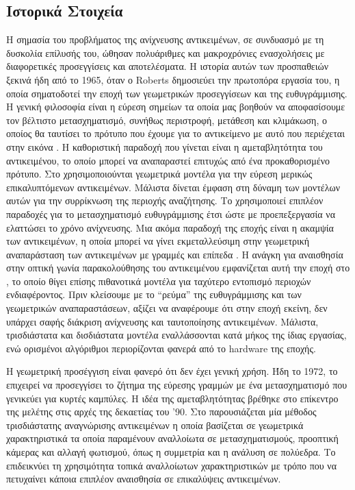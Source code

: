 \documentclass[11pt,a4paper,english,greek,twoside]{../Thesis}
\begin{document}
\subsection{Ιστορικά Στοιχεία}
Η σημασία του προβλήματος της ανίχνευσης αντικειμένων, σε συνδυασμό με τη δυσκολία επίλυσής του, ώθησαν πολυάριθμες και μακροχρόνιες ενασχολήσεις με διαφορετικές προσεγγίσεις και αποτελέσματα. Η ιστορία αυτών των προσπαθειών ξεκινά ήδη από το 1965, όταν ο Roberts \cite{roberts_1963} δημοσιεύει την πρωτοπόρα εργασία του, η οποία σηματοδοτεί την εποχή των γεωμετρικών προσεγγίσεων και της ευθυγράμμισης. Η γενική φιλοσοφία είναι η εύρεση σημείων τα οποία μας βοηθούν να αποφασίσουμε τον βέλτιστο μετασχηματισμό, συνήθως περιστροφή, μετάθεση και κλιμάκωση, ο οποίος θα ταυτίσει το πρότυπο που έχουμε για το αντικείμενο με αυτό που περιέχεται στην εικόνα \cite{huttenlocher_1987}. Η καθοριστική παραδοχή που γίνεται είναι η αμεταβλητότητα του αντικειμένου, το οποίο μπορεί να αναπαραστεί επιτυχώς από ένα προκαθορισμένο πρότυπο. Στο \cite{grimson_1987} χρησιμοποιούνται γεωμετρικά μοντέλα για την εύρεση μερικώς επικαλυπτόμενων αντικειμένων. Μάλιστα δίνεται έμφαση στη δύναμη των μοντέλων αυτών για την συρρίκνωση της περιοχής αναζήτησης. Το \cite{lozanoperez_1986} χρησιμοποιεί επιπλέον παραδοχές για το μετασχηματισμό ευθυγράμμισης έτσι ώστε με προεπεξεργασία να ελαττώσει το χρόνο ανίχνευσης. Μια ακόμα παραδοχή της εποχής είναι η ακαμψία των αντικειμένων, η οποία μπορεί να γίνει εκμεταλλεύσιμη στην γεωμετρική αναπαράσταση των αντικειμένων με γραμμές και επίπεδα \cite{faugeras_1986}. Η ανάγκη για αναισθησία στην οπτική γωνία παρακολούθησης του αντικειμένου εμφανίζεται αυτή την εποχή στο \cite{Lowe_1987}, το οποίο θίγει επίσης πιθανοτικά μοντέλα για ταχύτερο εντοπισμό περιοχών ενδιαφέροντος. Πριν κλείσουμε με το “ρεύμα” της ευθυγράμμισης και των γεωμετρικών αναπαραστάσεων, αξίζει να αναφέρουμε ότι στην εποχή εκείνη, δεν υπάρχει σαφής διάκριση ανίχνευσης και ταυτοποίησης αντικειμένων. Μάλιστα, τρισδιάστατα και δισδιάστατα μοντέλα εναλλάσσονται κατά μήκος της ίδιας εργασίας, ενώ ορισμένοι αλγόριθμοι περιορίζονται φανερά από το hardware της εποχής.

\par Η γεωμετρική προσέγγιση είναι φανερό ότι δεν έχει γενική χρήση. Ήδη το 1972, το \cite{duda_1972} επιχειρεί να προσεγγίσει το ζήτημα της εύρεσης γραμμών με ένα μετασχηματισμό που γενικεύει για κυρτές καμπύλες. Η ιδέα της αμεταβλητότητας βρέθηκε στο επίκεντρο της μελέτης στις αρχές της δεκαετίας του '90. Στο \cite{mundy_1994} παρουσιάζεται μία μέθοδος τρισδιάστατης αναγνώρισης αντικειμένων η οποία βασίζεται σε γεωμετρικά χαρακτηριστικά τα οποία παραμένουν αναλλοίωτα σε μετασχηματισμούς, προοπτική κάμερας και αλλαγή φωτισμού, όπως η συμμετρία και η ανάλυση σε πολύεδρα. Το \cite{rothwell_1992} επιδεικνύει τη χρησιμότητα τοπικά αναλλοίωτων χαρακτηριστικών με τρόπο που να πετυχαίνει κάποια επιπλέον αναισθησία σε επικαλύψεις αντικειμένων.
\end{document}
